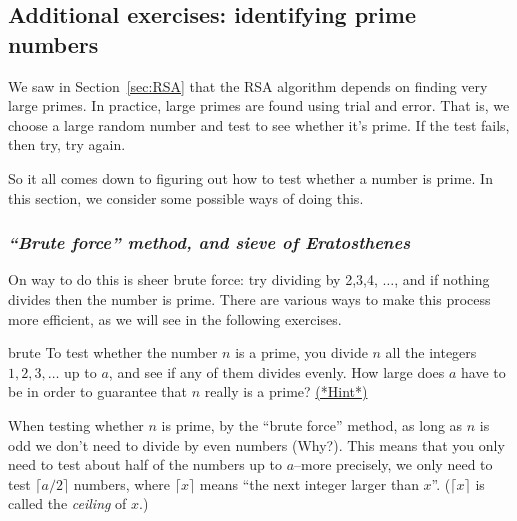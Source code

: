  
\subsection{Additional exercises: identifying prime numbers}\label{primality}
 
We saw in Section~\ref{sec:RSA} that the RSA algorithm depends on finding very large primes. In practice, large primes are found using trial and error. That is, we choose a large random number and test to see whether it's prime. 
If the test fails, then try, try again.

So it all comes down to figuring out how to test whether a number is prime. In this section, we consider some possible ways of doing this.

\subsubsection*{\emph{``Brute force'' method, and sieve of Eratosthenes}}
On way to do this is sheer brute force: try dividing by 2,3,4, $\ldots$, and if nothing divides then the number is prime. There are various ways to make this process more efficient, as we will see in the following exercises.

\begin{exercise}{brute}
To test whether the number $n$ is a prime, you divide $n$ all the integers $1,2,3, \dots$ up to $a$, and see if any of them divides evenly.  How large does $a$ have to be in order to guarantee that $n$ really is a prime?
\hyperref[sec:crypt:hints]{(*Hint*)}
\end{exercise}

When testing whether $n$ is prime, by the ``brute force'' method, as long as $n$ is odd we don't need to divide by even numbers (Why?). 
This means that you only need to test about half of the numbers up to $a$--more precisely, we only need to test $\lceil a/2 \rceil$ numbers, where $\lceil x \rceil$ means ``the next integer larger than $x$''. ($\lceil x \rceil$ is called the \emph{ceiling} of $x$.) 

